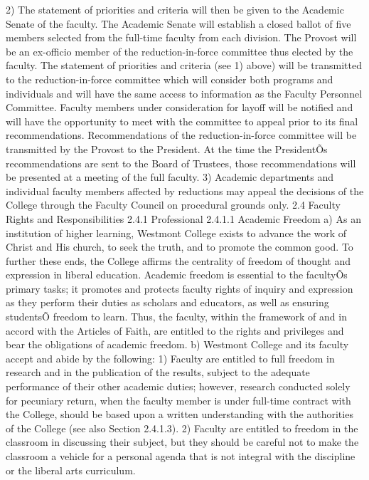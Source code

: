 \documentclass[letterpaper, 11pt]{article}
\begin{document}
	2) The statement of priorities and criteria will then be given to the Academic Senate of the faculty.  The Academic Senate will establish a closed ballot of five members selected from the full-time faculty from each division.  The Provost will be an ex-officio member of the reduction-in-force committee thus elected by the faculty.  The statement of priorities and criteria (see 1) above) will be transmitted to the reduction-in-force committee which will consider both programs and individuals and will have the same access to information as the Faculty Personnel Committee.  Faculty members under consideration for layoff will be notified and will have the opportunity to meet with the committee to appeal prior to its final recommendations.  Recommendations of the reduction-in-force committee will be transmitted by the Provost to the President. At the time the PresidentÕs recommendations are sent to the Board of Trustees, those recommendations will be presented at a meeting of the full faculty.
	3) Academic departments and individual faculty members affected by reductions may appeal the decisions of the College through the Faculty Council on procedural grounds only.
	2.4 Faculty Rights and Responsibilities
	2.4.1 Professional
	2.4.1.1 Academic Freedom
	a) As an institution of higher learning, Westmont College exists to advance the work of Christ and His church, to seek the truth, and to promote the common good.  To further these ends, the College affirms the centrality of freedom of thought and expression in liberal education.  Academic freedom is essential to the facultyÕs primary tasks; it promotes and protects faculty rights of inquiry and expression as they perform their duties as scholars and educators, as well as ensuring studentsÕ freedom to learn.  Thus, the faculty, within the framework of and in accord with the Articles of Faith, are entitled to the rights and privileges and bear the obligations of academic freedom.
	b) Westmont College and its faculty accept and abide by the following:
	1) Faculty are entitled to full freedom in research and in the publication of the results, subject to the adequate performance of their other academic duties; however, research conducted solely for pecuniary return, when the faculty member is under full-time contract with the College, should be based upon a written understanding with the authorities of the College (see also Section 2.4.1.3).
	2) Faculty are entitled to freedom in the classroom in discussing their subject, but they should be careful not to make the classroom a vehicle for a personal agenda that is not integral with the discipline or the liberal arts curriculum.
\end{document}
